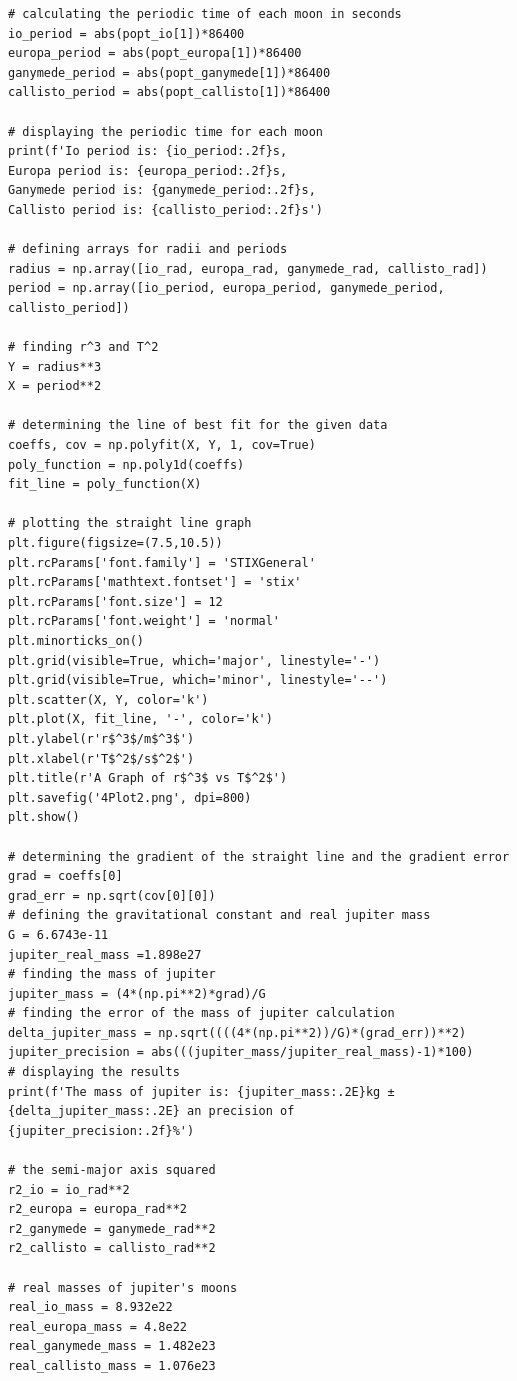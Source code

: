 \documentclass[12pt, a4paper]{article}
\begin{document}
\begin{verbatim}
# calculating the periodic time of each moon in seconds
io_period = abs(popt_io[1])*86400
europa_period = abs(popt_europa[1])*86400
ganymede_period = abs(popt_ganymede[1])*86400
callisto_period = abs(popt_callisto[1])*86400

# displaying the periodic time for each moon
print(f'Io period is: {io_period:.2f}s, 
Europa period is: {europa_period:.2f}s, 
Ganymede period is: {ganymede_period:.2f}s, 
Callisto period is: {callisto_period:.2f}s')

# defining arrays for radii and periods
radius = np.array([io_rad, europa_rad, ganymede_rad, callisto_rad])
period = np.array([io_period, europa_period, ganymede_period, callisto_period])

# finding r^3 and T^2
Y = radius**3
X = period**2

# determining the line of best fit for the given data
coeffs, cov = np.polyfit(X, Y, 1, cov=True)
poly_function = np.poly1d(coeffs)
fit_line = poly_function(X)

# plotting the straight line graph
plt.figure(figsize=(7.5,10.5))
plt.rcParams['font.family'] = 'STIXGeneral'
plt.rcParams['mathtext.fontset'] = 'stix'
plt.rcParams['font.size'] = 12
plt.rcParams['font.weight'] = 'normal'
plt.minorticks_on()
plt.grid(visible=True, which='major', linestyle='-')
plt.grid(visible=True, which='minor', linestyle='--')
plt.scatter(X, Y, color='k')
plt.plot(X, fit_line, '-', color='k')
plt.ylabel(r'r$^3$/m$^3$')
plt.xlabel(r'T$^2$/s$^2$')
plt.title(r'A Graph of r$^3$ vs T$^2$')
plt.savefig('4Plot2.png', dpi=800)
plt.show()

# determining the gradient of the straight line and the gradient error
grad = coeffs[0]
grad_err = np.sqrt(cov[0][0])
# defining the gravitational constant and real jupiter mass
G = 6.6743e-11
jupiter_real_mass =1.898e27
# finding the mass of jupiter
jupiter_mass = (4*(np.pi**2)*grad)/G
# finding the error of the mass of jupiter calculation
delta_jupiter_mass = np.sqrt((((4*(np.pi**2))/G)*(grad_err))**2)
jupiter_precision = abs(((jupiter_mass/jupiter_real_mass)-1)*100)
# displaying the results
print(f'The mass of jupiter is: {jupiter_mass:.2E}kg ± 
{delta_jupiter_mass:.2E} an precision of 
{jupiter_precision:.2f}%')

# the semi-major axis squared
r2_io = io_rad**2
r2_europa = europa_rad**2
r2_ganymede = ganymede_rad**2
r2_callisto = callisto_rad**2

# real masses of jupiter's moons
real_io_mass = 8.932e22
real_europa_mass = 4.8e22
real_ganymede_mass = 1.482e23
real_callisto_mass = 1.076e23


\end{verbatim}
\end{document}

